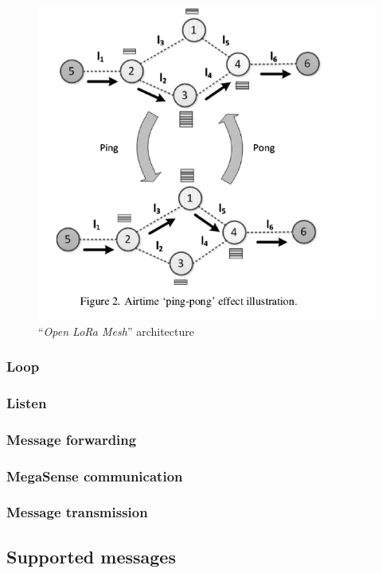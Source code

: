 				\begin{figure}[h]
					\centering
					\includegraphics[width=.7\textwidth]{resources/img/chap5/message_exchange}
					\caption{``\textit{Open LoRa Mesh}'' architecture}
				\end{figure}
			
			
			\subsubsection{Loop}
			
			\subsubsection{Listen}
			
			\subsubsection{Message forwarding}
			
			\subsubsection{MegaSense communication}
			
			\subsubsection{Message transmission}
			
		\subsection{Supported messages}
				
